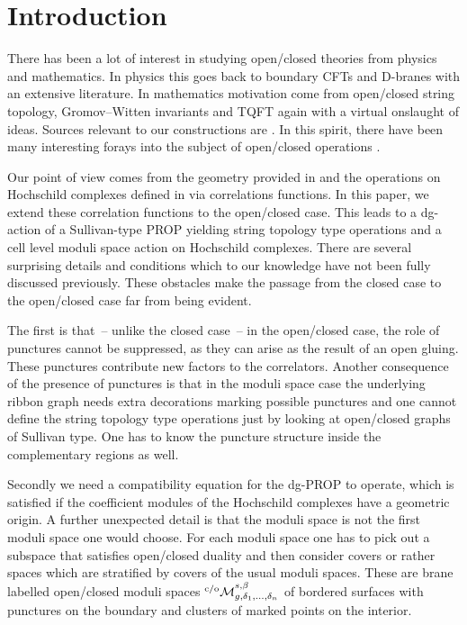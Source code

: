 \documentclass[pdftex]{sigma}
\def\Mco{{{}^{\rm c/o}\mathcal M}_{g,\delta_1,\dots,\delta_n}^{s,\beta}}
\begin{document}
\renewcommand{\thefootnote}{\arabic{footnote}}
\setcounter{footnote}{0}


\section{Introduction}
There has been a lot of interest in studying open/closed theories from physics and mathematics.
In physics this goes back to boundary CFTs and D-branes with an extensive literature.  In mathematics
 motivation come from open/closed string topology, Gromov--Witten invariants and TQFT again
 with a virtual onslaught of ideas.  Sources relevant to our constructions are \cite{CS,C1,C2,sullsurv}.
In this spirit, there have been many interesting  forays into the subject of open/closed
operations \cite{TZ,godin,ramirez,HVZ,BCT}.

Our point of view comes from the geometry  provided in \cite{KP,hoch1} and the
operations on Hochschild complexes def\/ined in \cite{hoch2} via correlations functions.
In this paper, we extend these correlation functions  to the open/closed
case. This leads to a dg-action of  a Sullivan-type PROP yielding string topology type operations and a cell level moduli space action on Hochschild complexes.
There are several surprising details  and conditions which to our knowledge have not been fully
discussed previously. These obstacles make the passage from the closed case to the open/closed case
far from being evident.

 The f\/irst is that~-- unlike the closed case~-- in the open/closed case, the role of punctures cannot be
suppressed, as they can arise as the result of an open gluing. These punctures
 contribute new factors to the correlators.
Another consequence of the presence of punctures is that in the moduli space case the underlying ribbon
 graph needs
extra decorations marking possible punctures and one cannot def\/ine
the string topology type operations just by looking at open/closed
graphs of Sullivan type. One has to know the puncture structure
inside the complementary regions as well.

Secondly we need a compatibility equation for the dg-PROP to operate, which is
satisf\/ied if the coef\/f\/icient modules of the Hochschild complexes have a geometric origin.
A further unexpected detail is that the moduli space is not the f\/irst moduli space one would choose.
For each moduli space one has to pick out a subspace  that satisf\/ies open/closed duality and then consider
covers or rather spaces which are stratif\/ied by covers of the usual moduli spaces. These are brane labelled
 open/closed moduli spaces $\Mco$ of bordered surfaces with punctures on the boundary and  clusters of marked
 points on the interior.
\end{document}
